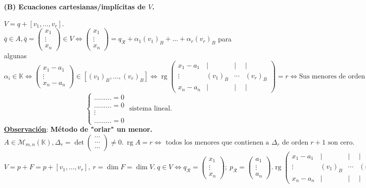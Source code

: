 \documentclass[11pt]{article}
\newcommand{\obs}{\underline{\textbf{Observación}}: }
\DeclareMathOperator{\rg}{rg}
\begin{document}
\paragraph{(B) Ecuaciones cartesianas/implícitas de $V$.} $V=q+[v_1,\ldots,v_r].$ $\bar{q}\in A,\bar{q}=\begin{pmatrix}
x_1\\ \vdots\\ x_n
\end{pmatrix}\in V\iff\begin{pmatrix}
x_1\\ \vdots\\ x_n
\end{pmatrix}=q_{\mathcal{R}}+\alpha_1(v_1)_B+\ldots+\alpha_r(v_r)_B$ para algunas $\alpha_i\in\mathbb{K}\iff\begin{pmatrix}
x_1-a_1\\ \vdots\\ x_n-a_n
\end{pmatrix}\in[(v_1)_B,\ldots,(v_r)_B]\iff\rg\begin{pmatrix}
x_1-a_1 & \vert & \vert & \vert\\
\vdots & (v_1)_B & \cdots & (v_r)_B\\
x_n-a_n & \vert & \vert & \vert
\end{pmatrix}=r\iff\textrm{Sus menores de orden }r+1\textrm{ son cero}:
$
$$
\begin{cases}
\ldots\ldots\ldots=0\\
\ldots\ldots\ldots=0\\
\vdots\\
\ldots\ldots\ldots=0
\end{cases}\textrm{ sistema lineal.}
$$
\obs \textbf{Método de "orlar" un menor.} $A\in\mathcal{M}_{m,n}(\mathbb{K}),\Delta_r=\det\begin{pmatrix}
\cdots\\
\cdots\\
\cdots
\end{pmatrix}\neq0.\ \rg A=r\iff\textrm{ todos los menores que contienen a }\Delta_r\textrm{ de orden }r+1\textrm{ son cero.}$
$V=p+F=p+[v_1,\ldots,v_r],\ r=\dim F=\dim V.\ q\in V\iff q_{\mathcal{R}}=\begin{pmatrix}
x_1\\
\vdots\\
x_n
\end{pmatrix};\ p_{\mathcal{R}}=\begin{pmatrix}
a_1\\
\vdots\\
a_n
\end{pmatrix}. \rg\begin{pmatrix}
x_1-a_1 & \vert & \vert & \vert\\
\vdots & (v_1)_B & \cdots & (v_r)_B\\
x_n-a_n & \vert & \vert & \vert
\end{pmatrix}=r.$\\
\end{document}
